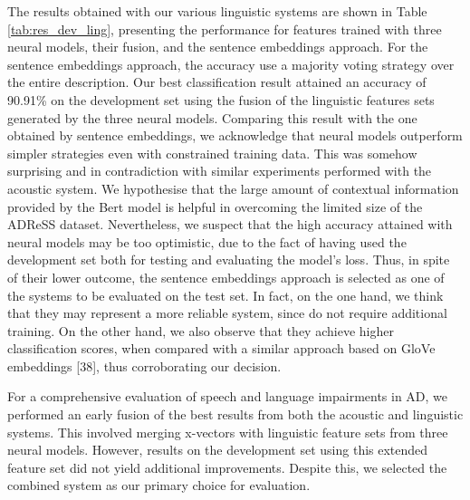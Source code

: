   The results obtained with our various linguistic systems are shown in Table \ref{tab:res_dev_ling}, presenting the performance for features trained with three neural models, their fusion, and the sentence embeddings approach. For the sentence embeddings approach, the accuracy use a majority voting strategy over the entire description. Our best classification result attained an accuracy of 90.91\% on the development set using the fusion of the linguistic features sets generated by the three neural models. Comparing this result with the one obtained by sentence embeddings, we acknowledge that neural models outperform simpler strategies even with constrained training data. This was somehow surprising and in contradiction with similar experiments performed with the acoustic system. We hypothesise that the large amount of contextual information provided by the Bert model is helpful in overcoming the limited size of the ADReSS dataset. Nevertheless, we suspect that the high accuracy attained with neural models may be too optimistic, due to the fact of having used the development set both for testing and evaluating the model’s loss. Thus, in spite of their lower outcome, the sentence embeddings approach is selected as one of the systems to be evaluated on the test set. In fact, on the one hand, we think that they may represent a more reliable system, since do not require additional training. On the other hand, we also observe that they achieve higher classification scores, when compared with a similar approach based on GloVe embeddings [38], thus corroborating our decision.

  For a comprehensive evaluation of speech and language impairments in AD, we performed an early fusion of the best results from both the acoustic and linguistic systems. This involved merging x-vectors with linguistic feature sets from three neural models. However, results on the development set using this extended feature set did not yield additional improvements. Despite this, we selected the combined system as our primary choice for evaluation.

